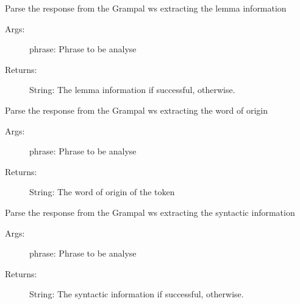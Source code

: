 \documentclass[letterpaper,10pt,english]{sphinxmanual}
\begin{document}
\begin{fulllineitems}

\begin{fulllineitems}
\label{\detokenize{ws:ws.Grampal.info_lemma}}
Parse the response from the Grampal ws extracting the lemma information
\begin{description}
\item[{Args:}] \leavevmode
phrase: Phrase to be analyse

\item[{Returns:}] \leavevmode
String: The lemma information if successful,  otherwise.

\end{description}

\end{fulllineitems}


\begin{fulllineitems}
\label{\detokenize{ws:ws.Grampal.info_orig}}
Parse the response from the Grampal ws extracting the word of origin
\begin{description}
\item[{Args:}] \leavevmode
phrase: Phrase to be analyse

\item[{Returns:}] \leavevmode
String: The word of origin of the token

\end{description}

\end{fulllineitems}


\begin{fulllineitems}
\label{\detokenize{ws:ws.Grampal.info_syntactic}}
Parse the response from the Grampal ws extracting the syntactic information
\begin{description}
\item[{Args:}] \leavevmode
phrase: Phrase to be analyse

\item[{Returns:}] \leavevmode
String: The syntactic information if successful,  otherwise.

\end{description}

\end{fulllineitems}


\end{fulllineitems}
\end{document}
